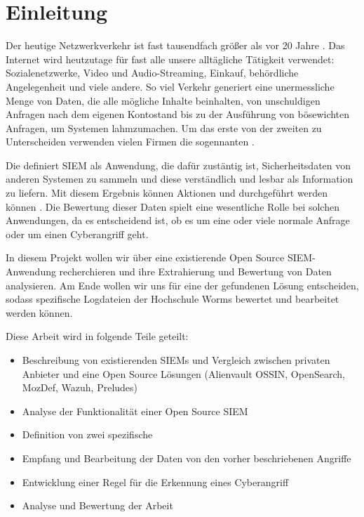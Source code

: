 \section{Einleitung}

Der heutige Netzwerkverkehr ist fast tausendfach größer als vor 20 Jahre \citep{Roser_I}. Das Internet wird heutzutage für fast alle unsere alltägliche Tätigkeit verwendet:  Sozialenetzwerke, Video und Audio-Streaming, Einkauf, behördliche Angelegenheit und viele andere. So viel Verkehr generiert eine unermessliche Menge von Daten, die alle mögliche Inhalte beinhalten, von unschuldigen Anfragen nach dem eigenen Kontostand bis zu der Ausführung von bösewichten Anfragen, um Systemen lahmzumachen. Um das erste von der zweiten zu Unterscheiden verwenden vielen Firmen die sogennanten .

Die  definiert \acrshort{SIEM} als Anwendung, die dafür zustäntig ist, Sicherheitsdaten von anderen Systemen zu sammeln und diese verständlich und lesbar als Information zu liefern. Mit diesem Ergebnis können Aktionen und durchgeführt werden können \citep{NIST_SIEM}. Die Bewertung dieser Daten spielt eine wesentliche Rolle bei solchen Anwendungen, da es entscheidend ist, ob es um eine oder viele normale Anfrage oder um einen \gls{Cyberangriff} geht.

In diesem Projekt wollen wir über eine existierende \gls{Open Source} \gls{SIEM}-Anwendung recherchieren und ihre Extrahierung und Bewertung von Daten analysieren. Am Ende wollen wir uns für eine der gefundenen Lösung entscheiden, sodass spezifische Logdateien der Hochschule Worms bewertet und bearbeitet werden können.

Diese Arbeit wird in folgende Teile geteilt:





\begin{itemize}[noitemsep]
   \item Beschreibung von existierenden \glspl{SIEM} und Vergleich zwischen privaten Anbieter und eine \gls{Open Source} Lösungen (Alienvault OSSIN, OpenSearch, MozDef, Wazuh, Preludes)
   \item Analyse der Funktionalität einer \gls{Open Source} \gls{SIEM}
   \item Definition von zwei spezifische 
   \item Empfang und Bearbeitung der Daten von den vorher beschriebenen Angriffe
   \item Entwicklung einer Regel für die Erkennung eines \gls{Cyberangriff}
   \item Analyse und Bewertung der Arbeit
\end{itemize}

